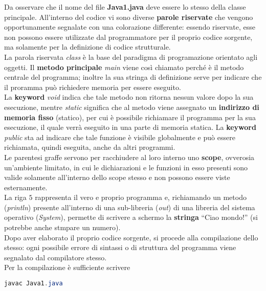 \documentclass[a4paper]{extarticle}
\newcommand{\quotes}[1]{``#1''}
\begin{document}
\vspace{1em}
\noindent
Da osservare che il nome del file \textbf{Java1.java} deve essere lo stesso della classe principale. All'interno del codice vi sono diverse \textbf{parole riservate} che vengono opportunamente segnalate con una colorazione differente: essendo riservate, esse non possono essere utilizzate dal programmatore per il proprio codice sorgente, ma solamente per la definizione di codice strutturale.\\
La parola riservata \emph{class} è la base del paradigma di programazione orientato agli oggetti. Il \textbf{metodo principale} \emph{main} viene così chiamato perché è il metodo centrale del programma; inoltre la sua stringa di definizione serve per indicare che il proramma può richiedere memoria per essere eseguito.\\
La \textbf{keyword} \emph{void} indica che tale metodo non ritorna nessun valore dopo la sua esecuzione, mentre \emph{static} significa che al metodo viene assegnato un \textbf{indirizzo di memoria fisso} (statico), per cui è possibile richiamare il programma per la sua esecuzione, il quale verrà eseguito in una parte di memoria statica. La \textbf{keyword} \emph{public} sta ad indicare che tale funzione è visibile globalmente e può essere richiamata, quindi eseguita, anche da altri programmi.\\
Le parentesi graffe servono per racchiudere al loro interno uno \textbf{scope}, ovverosia un'ambiente limitato, in cui le dichiarazioni e le funzioni in esso presenti sono valide solamente all'interno dello scope stesso e non possono essere viste esternamente.\\
La riga $5$ rappresenta il vero e proprio programma e, richiamando un metodo (\emph{println}) presente all'interno di una sub-libreria (\emph{out}) di una libreria del sistema operativo (\emph{System}), permette di scrivere a schermo la \textbf{stringa} \quotes{Ciao mondo!} (si potrebbe anche stmpare un numero).\\
Dopo aver elaborato il proprio codice sorgente, si procede alla compilazione dello stesso: ogni possibile errore di sintassi o di struttura del programma viene segnalato dal compilatore stesso.\\
Per la compilazione è sufficiente scrivere

\begin{lstlisting}[language=Java, caption=Esempio di compilazione in Java]
  javac Java1.java
\end{lstlisting}
\end{document}
